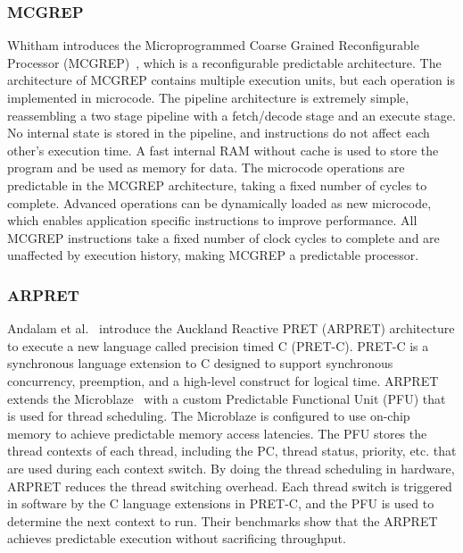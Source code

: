 \subsubsection{MCGREP}
Whitham introduces the Microprogrammed Coarse Grained Reconfigurable Processor (MCGREP)~\cite{whitam:06:mcgrep}, which is a reconfigurable predictable architecture.
The architecture of MCGREP contains multiple execution units, but each operation is implemented in microcode. 
The pipeline architecture is extremely simple, reassembling a two stage pipeline with a fetch/decode stage and an execute stage.
No internal state is stored in the pipeline, and instructions do not affect each other's execution time. 
A fast internal RAM without cache is used to store the program and be used as memory for data.    
The microcode operations are predictable in the MCGREP architecture, taking a fixed number of cycles to complete.
Advanced operations can be dynamically loaded as new microcode, which enables application specific instructions to improve performance.
All MCGREP instructions take a fixed number of clock cycles to complete and are unaffected by execution history, making MCGREP a predictable processor. 

\subsubsection{ARPRET}
Andalam et al.~\cite{pretc} introduce the Auckland Reactive PRET (ARPRET) architecture to execute a new language called precision timed C (PRET-C).
PRET-C is a synchronous language extension to C designed to support synchronous concurrency, preemption, and a high-level construct for logical time.
ARPRET extends the Microblaze~\cite{xilinx-microblaze} with a custom Predictable Functional Unit (PFU) that is used for thread scheduling.
The Microblaze is configured to use on-chip memory to achieve predictable memory access latencies. 
The PFU stores the thread contexts of each thread, including the PC, thread status, priority, etc. that are used during each context switch.
By doing the thread scheduling in hardware, ARPRET reduces the thread switching overhead. 
Each thread switch is triggered in software by the C language extensions in PRET-C, and the PFU is used to determine the next context to run.   
Their benchmarks show that the ARPRET achieves predictable execution without sacrificing throughput. 

